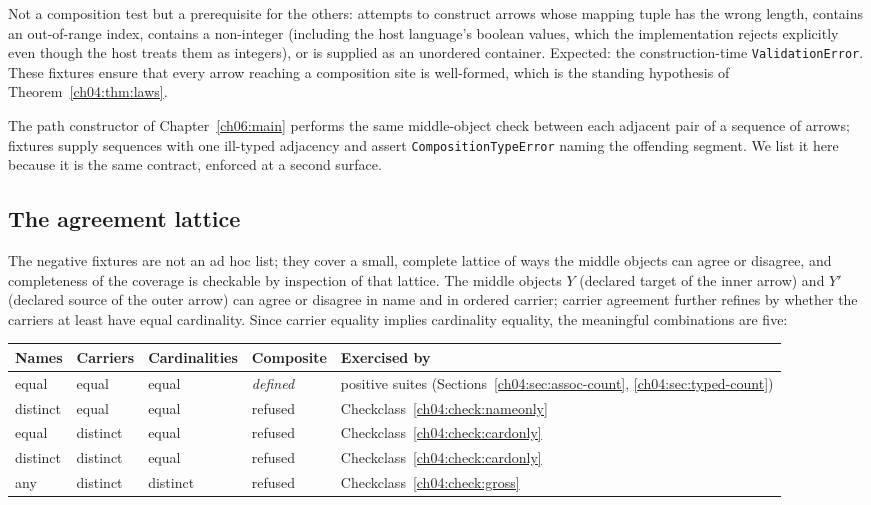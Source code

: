 \begin{checkclass}
\label{ch04:check:malformed}
Not a composition test but a prerequisite for the others: attempts to
construct arrows whose mapping tuple has the wrong length, contains an
out-of-range index, contains a non-integer (including the host language's
boolean values, which the implementation rejects explicitly even though the
host treats them as integers), or is supplied as an unordered container.
Expected: the construction-time \texttt{ValidationError}. These fixtures
ensure that every arrow reaching a composition site is well-formed, which is
the standing hypothesis of Theorem~\ref{ch04:thm:laws}.
\end{checkclass}

\begin{checkclass}
\label{ch04:check:path}
The path constructor of Chapter~\ref{ch06:main} performs the same middle-object
check between each adjacent pair of a sequence of arrows; fixtures supply
sequences with one ill-typed adjacency and assert
\texttt{CompositionTypeError} naming the offending segment. We list it here
because it is the same contract, enforced at a second surface.
\end{checkclass}

\subsection{The agreement lattice}
\label{ch04:sec:lattice}

The negative fixtures are not an ad hoc list; they cover a small, complete
lattice of ways the middle objects can agree or disagree, and completeness
of the coverage is checkable by inspection of that lattice. The middle
objects $Y$ (declared target of the inner arrow) and $Y'$ (declared source
of the outer arrow) can agree or disagree in name and in ordered carrier;
carrier agreement further refines by whether the carriers at least have
equal cardinality. Since carrier equality implies cardinality equality,
the meaningful combinations are five:

\begin{center}
\small
\begin{tabular}{@{}lllll@{}}
\toprule
Names & Carriers & Cardinalities & Composite & Exercised by \\
\midrule
equal & equal & equal & \emph{defined} & positive suites
(Sections~\ref{ch04:sec:assoc-count}, \ref{ch04:sec:typed-count}) \\
distinct & equal & equal & refused & Checkclass~\ref{ch04:check:nameonly} \\
equal & distinct & equal & refused & Checkclass~\ref{ch04:check:cardonly} \\
distinct & distinct & equal & refused & Checkclass~\ref{ch04:check:cardonly} \\
any & distinct & distinct & refused & Checkclass~\ref{ch04:check:gross} \\
\bottomrule
\end{tabular}
\end{center}

